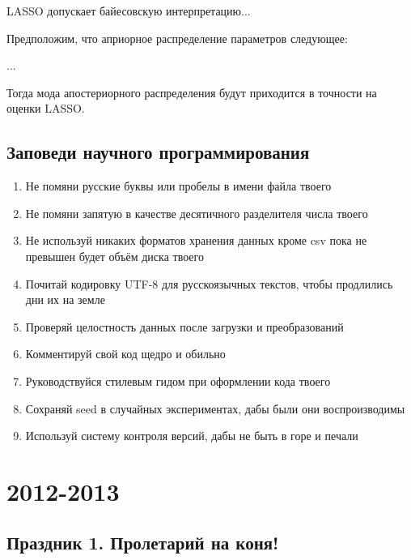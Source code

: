 \documentclass[12pt, a4paper]{article}
\begin{document}
LASSO допускает байесовскую интерпретацию...

Предположим, что априорное распределение параметров следующее:

...


Тогда мода апостериорного распределения будут приходится в точности на оценки LASSO.


\subsection{Заповеди научного программирования}

\begin{enumerate}
\item Не помяни русские буквы или пробелы в имени файла твоего
\item Не помяни запятую в качестве десятичного разделителя числа твоего
\item Не используй никаких форматов хранения данных кроме csv пока не превышен будет объём диска твоего
\item Почитай кодировку UTF-8 для русскоязычных текстов, чтобы продлились дни их на земле
\item Проверяй целостность данных после загрузки и преобразований
\item Комментируй свой код щедро и обильно
\item Руководствуйся стилевым гидом при оформлении кода твоего
\item Сохраняй seed в случайных экспериментах, дабы были они воспроизводимы
\item Используй систему контроля версий, дабы не быть в горе и печали
\end{enumerate}

\nocite{*}
\printbibliography

\section{2012-2013}

\subsection{Праздник 1. Пролетарий на коня!}
\end{document}
